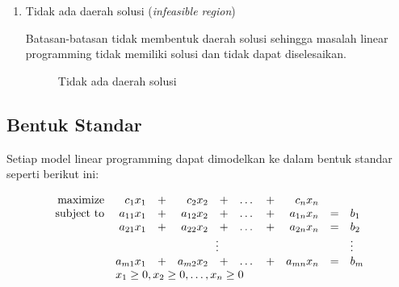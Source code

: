 \begin{enumerate}
	\item Tidak ada daerah solusi (\textit{infeasible region})

		Batasan-batasan tidak membentuk daerah solusi sehingga masalah linear programming tidak memiliki solusi dan tidak dapat diselesaikan.
			
		\begin{figure}[H]
    		\centering
			\caption{Tidak ada daerah solusi}
    	\end{figure}

\end{enumerate}

\subsection{Bentuk Standar}
\label{bentuk_standar}

Setiap model linear programming dapat dimodelkan ke dalam bentuk standar seperti berikut ini:
    	
\begin{equation*}
	\begin{array}{r r c r c r c r c l}
	    \text{maximize}		& c_1x_1    & + & c_2x_2 	& + & \dots & + & c_nx_n \\
		\text{subject to} 	& a_{11}x_1 & + & a_{12}x_2 & + & \dots & + & a_{1n}x_n & = & b_1 \\
    						& a_{21}x_1 & + & a_{22}x_2 & + & \dots & + & a_{2n}x_n & = & b_2 \\
                            & \multicolumn{7}{c}{\vdots}                            &   & \vdots \\
                            & a_{m1}x_1 & + & a_{m2}x_2 & + & \dots & + & a_{mn}x_n & = & b_m \\
                            & \multicolumn{9}{l}{x_1\geq0,x_2\geq0,\dots,x_n\geq0}
	\end{array}
\end{equation*}

